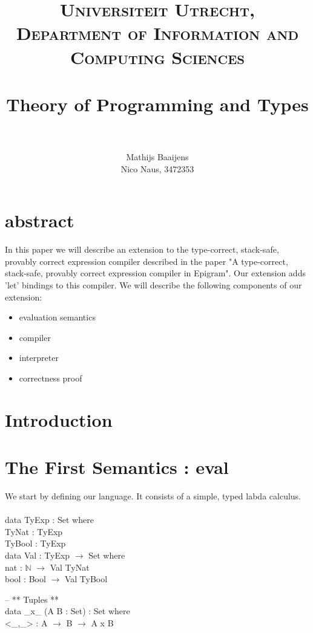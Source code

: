 \documentclass[paper=a4, fontsize=11pt]{scrartcl} %
\title{ 
\normalfont \normalsize 
\textsc{Universiteit Utrecht, Department of Information and Computing Sciences} \\ [25pt] %
\horrule{0.5pt} \\[0.4cm] %
\huge Theory of Programming and Types\\ %
\horrule{2pt} \\[0.5cm] %
}
\author{Mathijs Baaijens\\ Nico Naus, 3472353} %
\numberwithin{equation}{section} %
\numberwithin{figure}{section} %
\numberwithin{table}{section} %
\begin{document}
\maketitle %


\section{abstract}
In this paper we will describe an extension to the type-correct, stack-safe, provably correct expression compiler described in the paper "A type-correct, stack-safe, provably correct expression compiler in Epigram". Our extension adds 'let' bindings to this compiler. We will describe the following components of our extension:
\begin{itemize}
\item{evaluation semantics}
\item{compiler}
\item{interpreter}
\item{correctness proof}
\end{itemize}

\section{Introduction}
\section{The First Semantics : eval}
We start by defining our language. It consists of a simple, typed labda calculus.\\
\\
\ttfamily
data TyExp : Set where\\
  TyNat : TyExp\\
  TyBool : TyExp\\

data Val : TyExp $\rightarrow$ Set where\\
  nat : $\mathbb{N}$ $\rightarrow$ Val TyNat\\
  bool : Bool $\rightarrow$ Val TyBool\\
\normalfont

\ttfamily
-- ** Tuples **\\

data \_x\_ (A B : Set) : Set where\\
  <\_,\_> : A $\rightarrow$ B $\rightarrow$ A x B\\
\end{document}
